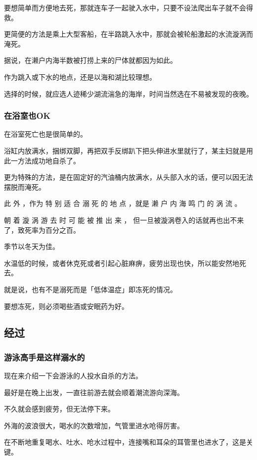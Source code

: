 \documentclass[UTF8]{ctexart}
\begin{document}
要想简单而方便地去死，那就连车子一起驶入水中，只要不设法爬出车子就不会得救。

更简便的方法是乘上大型客船，在半路跳入水中，那就会被轮船激起的水流漩涡而淹死。

据说，在濑户内海半数被打捞上来的尸体就都因为如此。

作为跳入或下水的地点，还是以海和湖比较理想。

选择的时候，就应选人迹稀少湖流湍急的海岸，时间当然选在不易被发现的夜晚。

\subsubsection*{在浴室也OK}

在浴室死亡也是很简单的。

浴缸内放满水，捆绑双脚，再把双手反绑趴下把头伸进水里就行了，某主妇就是用此一方法成功地自杀了。

更为特殊的方法，是在固定好的汽油桶内放满水，从头部入水的话，便可以因无法摆脱而淹死。

此 外 ，作为 特 别 适 合 溺 死 的 地 点 ，就是 濑 户 内 海 鸣 门 的 涡 流 。

朝 着 漩 涡 游 去 时 可 能 被 推 出 来 ， 但一旦被漩涡卷入的话就再也出不来了，致死率为百分之百。

季节以冬天为佳。

水温低的时候，或者休克死或者引起心脏麻痹，疲劳出现也快，所以能安然地死去。

就是说，也有不是溺死而是「低体温症」即冻死的情况。

要想冻死，则必须喝些酒或安眠药为好。

\subsection{经过}

\subsubsection*{游泳高手是这样溺水的}

现在来介绍一下会游泳的人投水自杀的方法。

最好是在晚上出发，一直往前游去就会顺着潮流游向深海。

不久就会感到疲劳，但无法停下来。

外海的波浪很大，喝水的次数增加，气管里进水呛得厉害。

在不断地重复喝水、吐水、呛水过程中，连接嘴和耳朵的耳管里也进水了，这是关键。
\end{document}
